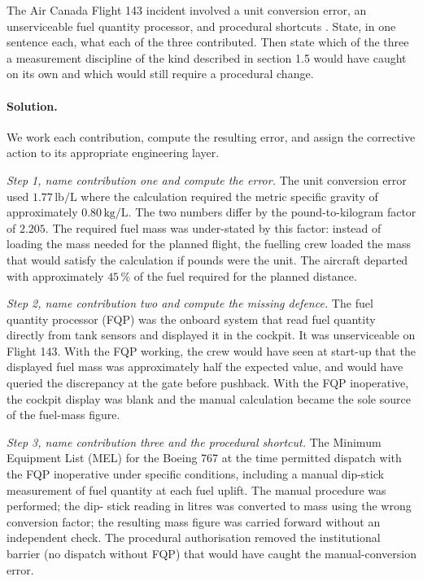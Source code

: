 \begin{exercise}
The Air Canada Flight 143 incident involved a unit conversion error,
an unserviceable fuel quantity processor, and procedural shortcuts
\cite{acc:lockwood-gimli1985}. State, in one sentence each, what
each of the three contributed. Then state which of the three a
measurement discipline of the kind described in section 1.5 would
have caught on its own and which would still require a procedural
change.

\paragraph{Solution.}
We work each contribution, compute the resulting error, and assign
the corrective action to its appropriate engineering layer.

\textit{Step 1, name contribution one and compute the error.} The
unit conversion error used $1.77 \,\text{lb/L}$ where the calculation
required the metric specific gravity of approximately
$0.80 \,\si{\kilogram\per\liter}$. The two numbers differ by the
pound-to-kilogram factor of $2.205$. The required fuel mass was
under-stated by this factor: instead of loading the mass needed for
the planned flight, the fuelling crew loaded the mass that would
satisfy the calculation if pounds were the unit. The aircraft
departed with approximately $45\,\%$ of the fuel required for the
planned distance.

\textit{Step 2, name contribution two and compute the missing
defence.} The fuel quantity processor (FQP) was the onboard system
that read fuel quantity directly from tank sensors and displayed it
in the cockpit. It was unserviceable on Flight 143. With the FQP
working, the crew would have seen at start-up that the displayed
fuel mass was approximately half the expected value, and would have
queried the discrepancy at the gate before pushback. With the FQP
inoperative, the cockpit display was blank and the manual
calculation became the sole source of the fuel-mass figure.

\textit{Step 3, name contribution three and the procedural shortcut.}
The Minimum Equipment List (MEL) for the Boeing 767 at the time
permitted dispatch with the FQP inoperative under specific
conditions, including a manual dip-stick measurement of fuel quantity
at each fuel uplift. The manual procedure was performed; the dip-
stick reading in litres was converted to mass using the wrong
conversion factor; the resulting mass figure was carried forward
without an independent check. The procedural authorisation removed
the institutional barrier (no dispatch without FQP) that would have
caught the manual-conversion error.


\end{exercise}
